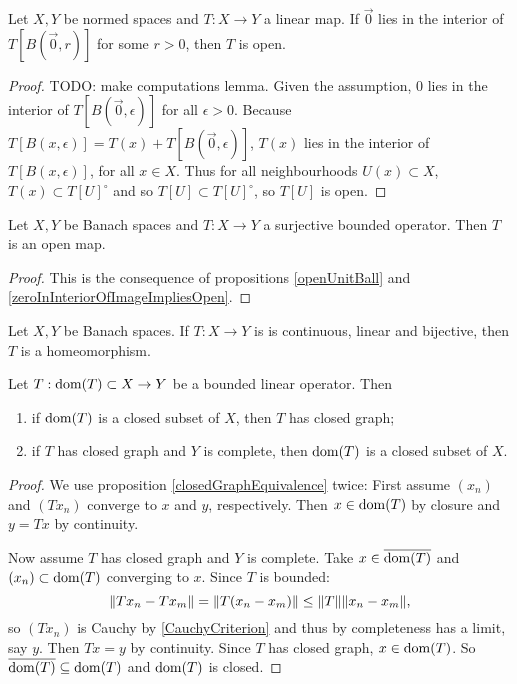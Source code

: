 \begin{proposition} \label{zeroInInteriorOfImageImpliesOpen}
Let $X,Y$ be normed spaces and $T: X\to Y$ a linear map. If $\vec{0}$ lies in the interior of $T[B(\vec{0},r)]$ for some $r>0$, then $T$ is open.
\end{proposition}
\begin{proof}
TODO: make computations lemma.
Given the assumption, $0$ lies in the interior of $T[B(\vec{0},\epsilon)]$ for all $\epsilon>0$.
Because $T[B(x,\epsilon)] = T(x) + T[B(\vec{0},\epsilon)]$, $T(x)$ lies in the interior of $T[B(x,\epsilon)]$, for all $x\in X$.
Thus for all neighbourhoods $U(x)\subset X$, $T(x)\subset T[U]^\circ$ and so $T[U] \subset T[U]^\circ$, so $T[U]$ is open.
\end{proof}

\begin{theorem}
Let $X,Y$ be Banach spaces and $T:X\to Y$ a surjective bounded operator. Then $T$ is an open map.
\end{theorem}
\begin{proof}
This is the consequence of propositions \ref{openUnitBall} and \ref{zeroInInteriorOfImageImpliesOpen}.
\end{proof}
\begin{corollary} \label{boundedInverse}
Let $X,Y$ be Banach spaces. If $T:X\to Y$ is is continuous, linear and bijective, then $T$ is a homeomorphism.
\end{corollary}


\begin{proposition}
Let $T: \operatorname{dom}(T)\subset X\to Y$ be a bounded linear operator. Then
\begin{enumerate}
\item if $\operatorname{dom}(T)$ is a closed subset of $X$, then $T$ has closed graph;
\item if $T$ has closed graph and $Y$ is complete, then $\operatorname{dom}(T)$ is a closed subset of $X$.
\end{enumerate}
\end{proposition}
\begin{proof}
We use proposition \ref{closedGraphEquivalence} twice: First assume $(x_n)$ and $(Tx_n)$ converge to $x$ and $y$, respectively. Then $x\in\operatorname{dom}(T)$ by closure and $y = Tx$ by continuity.

Now assume $T$ has closed graph and $Y$ is complete. Take $x\in\overline{\operatorname{dom}(T)}$ and $(x_n)\subset \operatorname{dom}(T)$ converging to $x$. Since $T$ is bounded:
\[ \lVert Tx_n - Tx_m\rVert = \lVert T(x_n-x_m)\rVert \leq \lVert T\rVert\lVert x_n-x_m\rVert, \]
so $(Tx_n)$ is Cauchy by \ref{CauchyCriterion} and thus by completeness has a limit, say $y$. Then $Tx=y$ by continuity. Since $T$ has closed graph, $x\in\operatorname{dom}(T)$. So $\overline{\operatorname{dom}(T)}\subseteq \operatorname{dom}(T)$ and $\operatorname{dom}(T)$ is closed. 
\end{proof}

